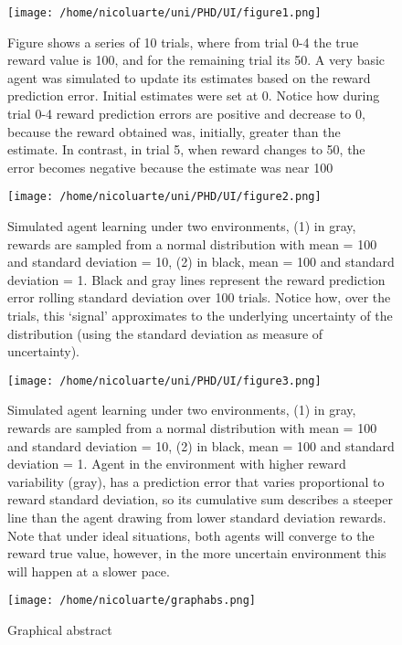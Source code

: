 \documentclass[
]{/home/nicoluarte/Downloads/templates/PNAS-template-main.tex}
\begin{document}
\begin{figure}
\centering
\texttt{[image: /home/nicoluarte/uni/PHD/UI/figure1.png]}
\caption{Figure shows a series of 10 trials, where from trial 0-4 the
true reward value is 100, and for the remaining trial its 50. A very
basic agent was simulated to update its estimates based on the reward
prediction error. Initial estimates were set at 0. Notice how during
trial 0-4 reward prediction errors are positive and decrease to 0,
because the reward obtained was, initially, greater than the estimate.
In contrast, in trial 5, when reward changes to 50, the error becomes
negative because the estimate was near 100\label{rpe}}
\end{figure}

\begin{figure}
\centering
\texttt{[image: /home/nicoluarte/uni/PHD/UI/figure2.png]}
\caption{Simulated agent learning under two environments, (1) in gray,
rewards are sampled from a normal distribution with mean = 100 and
standard deviation = 10, (2) in black, mean = 100 and standard deviation
= 1. Black and gray lines represent the reward prediction error rolling
standard deviation over 100 trials. Notice how, over the trials, this
`signal' approximates to the underlying uncertainty of the distribution
(using the standard deviation as measure of uncertainty).
\label{uncertainty}}
\end{figure}

\begin{figure}
\centering
\texttt{[image: /home/nicoluarte/uni/PHD/UI/figure3.png]}
\caption{Simulated agent learning under two environments, (1) in gray,
rewards are sampled from a normal distribution with mean = 100 and
standard deviation = 10, (2) in black, mean = 100 and standard deviation
= 1. Agent in the environment with higher reward variability (gray), has
a prediction error that varies proportional to reward standard
deviation, so its cumulative sum describes a steeper line than the agent
drawing from lower standard deviation rewards. Note that under ideal
situations, both agents will converge to the reward true value, however,
in the more uncertain environment this will happen at a slower pace.
\label{uncertainty_error}}
\end{figure}

\newpage

\begin{figure}
\centering
\texttt{[image: /home/nicoluarte/graphabs.png]}
\caption{Graphical abstract}
\end{figure}
\end{document}
